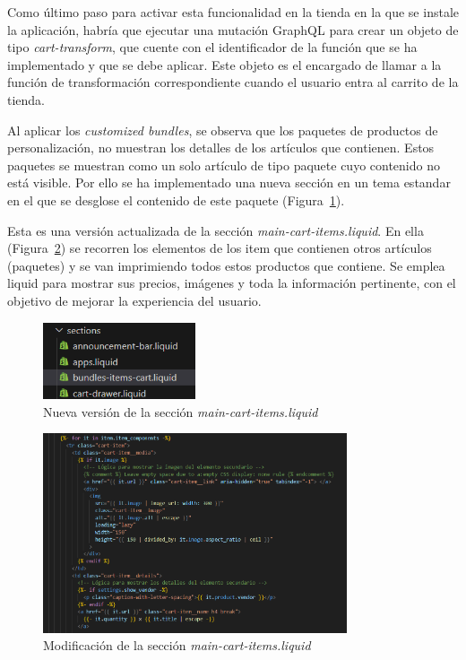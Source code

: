 \documentclass[11pt]{article}
\begin{document}
Como último paso para activar esta funcionalidad en la tienda en la que se instale la aplicación, habría que ejecutar una mutación GraphQL para crear un objeto de tipo \textit{cart-transform}, que cuente con el identificador de la función que se ha implementado
y que se debe aplicar. Este objeto es el encargado de llamar a la función de transformación correspondiente cuando el usuario entra al carrito de la tienda.

Al aplicar los \textit{customized bundles}, se observa que los paquetes de productos de personalización, no muestran los detalles de los artículos que contienen. Estos 
paquetes se muestran como un solo artículo de tipo paquete cuyo contenido no está visible. Por ello se ha implementado una nueva sección en un tema estandar en el que 
se desglose el contenido de este paquete (Figura~\ref{fig:seccionTema}).

Esta es una versión actualizada de la sección \textit{main-cart-items.liquid}. En ella (Figura~\ref{fig:modificacionTema}) se recorren los 
elementos de los item que contienen otros artículos (paquetes) y se van imprimiendo todos estos productos que contiene. Se emplea liquid para mostrar sus precios, imágenes y toda la información pertinente,
con el objetivo de mejorar la experiencia del usuario.

\begin{figure}[H]
    \centering
    \includegraphics[width=0.4\textwidth]{imagenes-tema/creacionSeccionTema.png}
    \caption{\label{fig:seccionTema} Nueva versión de la sección \textit{main-cart-items.liquid}} 
    \vspace{\fill}
\end{figure}

\begin{figure}[H]
    \centering
    \includegraphics[width=0.8\textwidth]{imagenes-tema/modificaciondetema.png}
    \caption{\label{fig:modificacionTema} Modificación de la sección \textit{main-cart-items.liquid}} 
    \vspace{\fill}
\end{figure}
\end{document}
